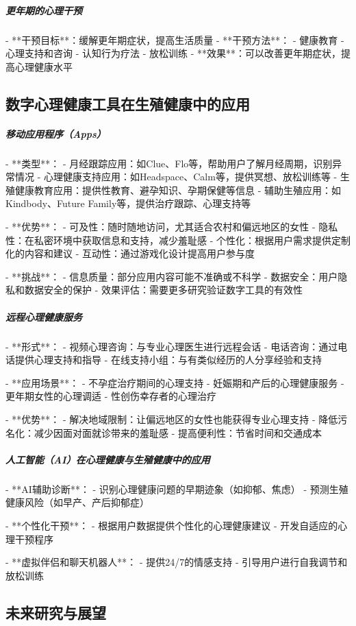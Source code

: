 \begin{enumerate}
\subparagraph{更年期的心理干预}

- **干预目标**：缓解更年期症状，提高生活质量
- **干预方法**：
  - 健康教育
  - 心理支持和咨询
  - 认知行为疗法
  - 放松训练
- **效果**：可以改善更年期症状，提高心理健康水平

\subsection{数字心理健康工具在生殖健康中的应用}

\subparagraph{移动应用程序（Apps）}

- **类型**：
  - 月经跟踪应用：如Clue、Flo等，帮助用户了解月经周期，识别异常情况
  - 心理健康支持应用：如Headspace、Calm等，提供冥想、放松训练等
  - 生殖健康教育应用：提供性教育、避孕知识、孕期保健等信息
  - 辅助生殖应用：如Kindbody、Future Family等，提供治疗跟踪、心理支持等

- **优势**：
  - 可及性：随时随地访问，尤其适合农村和偏远地区的女性
  - 隐私性：在私密环境中获取信息和支持，减少羞耻感
  - 个性化：根据用户需求提供定制化的内容和建议
  - 互动性：通过游戏化设计提高用户参与度

- **挑战**：
  - 信息质量：部分应用内容可能不准确或不科学
  - 数据安全：用户隐私和数据安全的保护
  - 效果评估：需要更多研究验证数字工具的有效性

\subparagraph{远程心理健康服务}

- **形式**：
  - 视频心理咨询：与专业心理医生进行远程会话
  - 电话咨询：通过电话提供心理支持和指导
  - 在线支持小组：与有类似经历的人分享经验和支持

- **应用场景**：
  - 不孕症治疗期间的心理支持
  - 妊娠期和产后的心理健康服务
  - 更年期女性的心理调适
  - 性创伤幸存者的心理治疗

- **优势**：
  - 解决地域限制：让偏远地区的女性也能获得专业心理支持
  - 降低污名化：减少因面对面就诊带来的羞耻感
  - 提高便利性：节省时间和交通成本

\subparagraph{人工智能（AI）在心理健康与生殖健康中的应用}

- **AI辅助诊断**：
  - 识别心理健康问题的早期迹象（如抑郁、焦虑）
  - 预测生殖健康风险（如早产、产后抑郁症）

- **个性化干预**：
  - 根据用户数据提供个性化的心理健康建议
  - 开发自适应的心理干预程序

- **虚拟伴侣和聊天机器人**：
  - 提供24/7的情感支持
  - 引导用户进行自我调节和放松训练

\subsection{未来研究与展望}


\end{enumerate}
